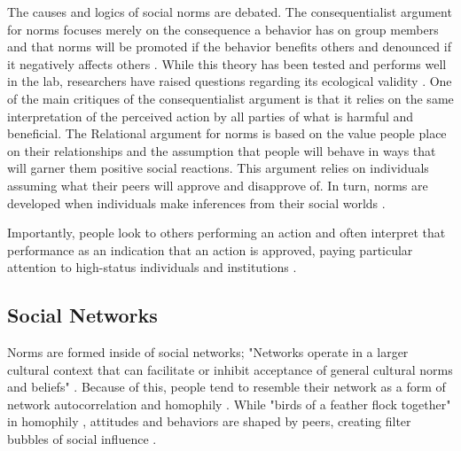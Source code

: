 The causes and logics of social norms are debated. The consequentialist
argument for norms focuses merely on the consequence a behavior has on
group members and that norms will be promoted if the behavior benefits
others and denounced if it negatively affects others \citep{ullmannmargalitEmergenceNorms1977}.
 While this theory has been tested and performs well in the lab,
researchers have raised questions regarding its ecological validity
\citep{horneNormsIntegratedFramework2020}. One of the main critiques of the
consequentialist argument is that it relies on the same interpretation of the perceived action
by all parties of what is harmful and beneficial. The Relational argument 
for norms is based on the value people place on their relationships and
the assumption that people will behave in ways that will garner them
positive social reactions. This argument relies on individuals assuming
what their peers will approve and disapprove of. In turn, norms are
developed when individuals make inferences from their social worlds
\citep{fryeCulturalMeaningsAggregation2017}.

Importantly, people look to others performing an action and often
interpret that performance as an indication that an action is approved,
paying particular attention to high-status individuals and institutions
\citep{robalinoPeerEffectsAdolescent2018, tankardEffectSupremeCourt2017}.

\subsection{Social Networks}

Norms are formed inside of social networks; "Networks operate in a larger cultural
context that can facilitate or inhibit acceptance of general cultural norms and
beliefs" \citep[][p. 44]{pescosolidoDurkheimSuicideReligion1989}. 
Because of this, people tend to resemble
their network as a form of network autocorrelation and homophily
\citep{dellapostaWhyLiberalsDrink2015}. While "birds of a feather flock
together" in homophily \citep{mcphersonBirdsFeatherHomophily2001}, attitudes and
behaviors are shaped by peers, creating filter bubbles of social influence
\citep{dellapostaWhyLiberalsDrink2015}.

